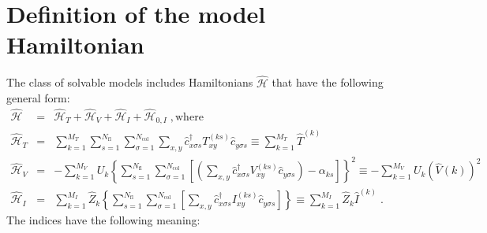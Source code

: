 
\section{Definition of the model Hamiltonian}


 
The class of solvable models includes  Hamiltonians $\hat{\mathcal{H}}$ that have the following general form:
\begin{eqnarray}
\hat{\mathcal{H}}&=&\hat{\mathcal{H}}_{T}+\hat{\mathcal{H}}_{V} +  \hat{\mathcal{H}}_{I} +   \hat{\mathcal{H}}_{0,I}\;,\mathrm{where}
\label{eqn:general_ham}\\
\hat{\mathcal{H}}_{T}
&=&
\sum\limits_{k=1}^{M_T}
\sum\limits_{s=1}^{N_{\mathrm{fl}}}
\sum\limits_{\sigma=1}^{N_{\mathrm{col}}}
\sum\limits_{x,y}
\hat{c}^{\dagger}_{x \sigma   s}T_{xy}^{(k s)} \hat{c}^{\phantom\dagger}_{y \sigma s}  \equiv  \sum\limits_{k=1}^{M_T} \hat{T}^{(k)}
\label{eqn:general_ham_t}\\
\hat{\mathcal{H}}_{V}
&=&
-
\sum\limits_{k=1}^{M_V}U_{k}
\left\{
\sum\limits_{s=1}^{N_{\mathrm{fl}}}
\sum\limits_{\sigma=1}^{N_{\mathrm{col}}}
\left[
\left(
\sum\limits_{x,y}
\hat{c}^{\dagger}_{x \sigma s}V_{xy}^{(k s)}\hat{c}^{\phantom\dagger}_{y \sigma s}
\right)
-\alpha_{k s} 
\right]
\right\}^{2}  \equiv   -
\sum\limits_{k=1}^{M_V}U_{k}   \left(\hat{V}{(k)} \right)^2
\label{eqn:general_ham_v}\\
\hat{\mathcal{H}}_{I}  & = &
\sum\limits_{k=1}^{M_I} \hat{Z}_{k} 
\left\{
\sum\limits_{s=1}^{N_{\mathrm{fl}}}
\sum\limits_{\sigma=1}^{N_{\mathrm{col}}}
\left[
\sum\limits_{x,y}
\hat{c}^{\dagger}_{x \sigma s} I_{xy}^{(k s)}\hat{c}^{\phantom\dagger}_{y \sigma s}
\right]
\right\} \equiv \sum\limits_{k=1}^{M_I} \hat{Z}_{k}    \hat{I}^{(k)} 
\;.\label{eqn:general_ham_i}
\end{eqnarray}
The indices have the following meaning:
